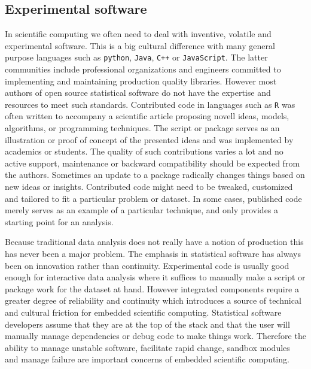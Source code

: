 \subsection{Experimental software}

In scientific computing we often need to deal with inventive, volatile and experimental  software. This is a big cultural difference with many general purpose languages such as \texttt{python}, \texttt{Java}, \texttt{C++} or \texttt{JavaScript}. The latter communities include professional organizations and engineers committed to implementing and maintaining production quality libraries. However most authors of open source statistical software do not have the expertise and resources to meet such standards. Contributed code in languages such as \texttt{R} was often written to accompany a scientific article proposing novell ideas, models, algorithms, or programming techniques. The script or package serves as an illustration or proof of concept of the presented ideas and was implemented by academics or students. The quality of such contributions varies a lot and no active support, maintenance or backward compatibility should be expected from the authors. Sometimes an update to a package radically changes things based on new ideas or insights. Contributed code might need to be tweaked, customized and tailored to fit a particular problem or dataset. In some cases, published code merely serves as an example of a particular technique, and only provides a starting point for an analysis. 

Because traditional data analysis does not really have a notion of production this has never been a major problem. The emphasis in statistical software has always been on innovation rather than continuity. Experimental code is usually good enough for interactive data analysis where it suffices to manually make a script or package work for the dataset at hand. However integrated components require a greater degree of reliability and continuity which introduces a source of technical and cultural friction for embedded scientific computing. Statistical software developers assume that they are at the top of the stack and that the user will manually manage dependencies or debug code to make things work. 
Therefore the ability to manage unstable software, facilitate rapid change, sandbox modules and manage failure are important concerns of embedded scientific computing.


